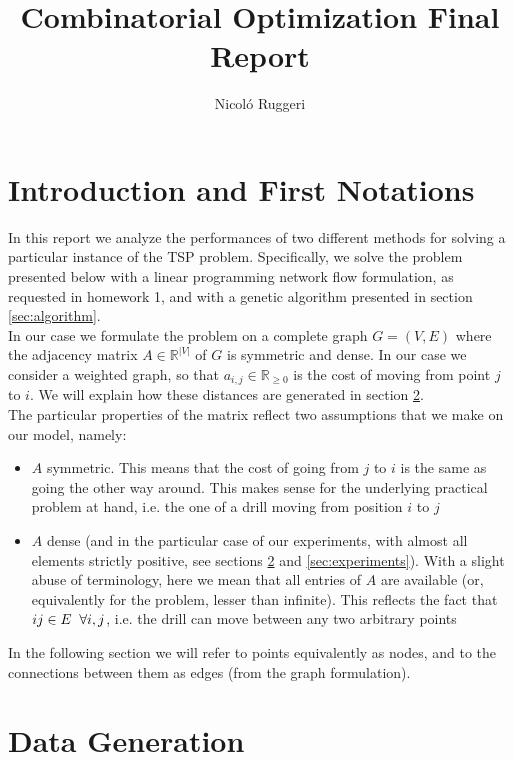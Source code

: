 \documentclass{article}
\author{Nicol\'o Ruggeri}
\title{Combinatorial Optimization Final Report}
\date{\null}
\begin{document}
\maketitle

\section{Introduction and  First Notations}
In this report we analyze the performances of two different methods for solving a particular instance of the TSP problem. Specifically, we solve the problem presented below with a linear programming network flow formulation, as requested in homework 1, and with a genetic algorithm presented in section \ref{sec:algorithm}. \\
In our case we formulate the problem on a complete graph $G = (V, E)$ where the adjacency matrix $A \in \mathbb{R}^{|V|}$ of $G$ is symmetric and dense. In our case we consider a weighted graph, so that $a_{i,j} \in \mathbb{R}_{\ge 0}$ is the cost of moving from point $j$ to $i$. We will explain how these distances are generated in section \ref{sec:data}.\\
The particular properties of the matrix reflect two assumptions that we make on our model, namely:
\begin{itemize}
\item $A$ symmetric. This means that the cost of going from $j$ to $i$ is the same as going the other way around. This makes sense for the underlying practical problem at hand, i.e. the one of a drill moving from position $i$ to $j$
\item $A$ dense (and in the particular case of our experiments, with almost all elements strictly positive, see sections \ref{sec:data} and \ref{sec:experiments}). With a slight abuse of terminology, here we mean that all entries of $A$ are available (or, equivalently for the problem, lesser than infinite). This reflects the fact that $ij \in E \hspace{2mm} \forall i, j$, i.e. the drill can move between any two arbitrary points
\end{itemize}
In the following section we will refer to points equivalently as nodes, and to the connections between them as edges (from the graph formulation).


\section{Data Generation}\label{sec:data}
\end{document}
